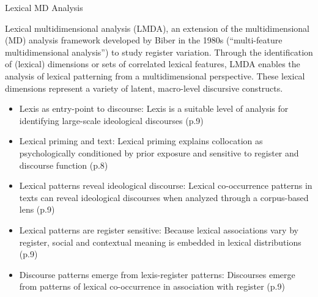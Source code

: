\begin{frame}{Lexical MD Analysis}
    \scriptsize
    \vspace*{-4em}

    \begin{exampleblock}{\cite[p.1]{berbersardinhaLexicalMultiDimensionalAnalysis2025}}
    Lexical multidimensional analysis (LMDA), an extension of the multidimensional (MD) analysis framework developed by Biber in the 1980s (``multi-feature multidimensional analysis'') to study register variation. Through the identification of (lexical) dimensions or sets of correlated lexical features, LMDA enables the analysis of lexical patterning from a multidimensional perspective. These lexical dimensions represent a variety of latent, macro-level discursive constructs.
    \end{exampleblock}

    \begin{itemize}
    \item Lexis as entry-point to discourse: Lexis is a suitable level of analysis for identifying large-scale ideological discourses (p.9)
    \item Lexical priming and text: Lexical priming \citep{hoeyLexicalPrimingNew2007} explains collocation as psychologically conditioned by prior exposure and sensitive to register and discourse function (p.8)
    \item Lexical patterns reveal ideological discourse: Lexical co-occurrence patterns in texts can reveal ideological discourses when analyzed through a corpus-based lens (p.9)
    \item Lexical patterns are register sensitive: Because lexical associations vary by register, social and contextual meaning is embedded in lexical distributions (p.9)
    \item Discourse patterns emerge from lexis-register patterns: Discourses emerge from patterns of lexical co-occurrence in association with register (p.9)
    \end{itemize}
\end{frame}





